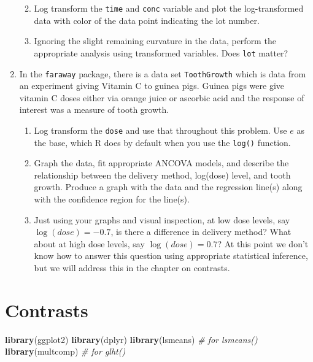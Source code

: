 \documentclass[]{book}
\newenvironment{Shaded}{\begin{snugshade}}{\end{snugshade}}
\newcommand{\KeywordTok}[1]{\textcolor[rgb]{0.13,0.29,0.53}{\textbf{{#1}}}}
\newcommand{\CommentTok}[1]{\textcolor[rgb]{0.56,0.35,0.01}{\textit{{#1}}}}
\newcommand{\NormalTok}[1]{{#1}}
\providecommand{\tightlist}{%
  \setlength{\itemsep}{0pt}\setlength{\parskip}{0pt}}
\theoremstyle{definition}
\theoremstyle{definition}
\theoremstyle{remark}
\begin{document}
\begin{enumerate}
  \begin{enumerate}
  \def\labelenumii{\alph{enumii}.}
  \tightlist
  \item
    Log transform the \texttt{time} and \texttt{conc} variable and plot
    the log-transformed data with color of the data point indicating the
    lot number.
  \item
    Ignoring the slight remaining curvature in the data, perform the
    appropriate analysis using transformed variables. Does \texttt{lot}
    matter?
  \end{enumerate}
\item
  In the \texttt{faraway} package, there is a data set
  \texttt{ToothGrowth} which is data from an experiment giving Vitamin C
  to guinea pigs. Guinea pigs were give vitamin C doses either via
  orange juice or ascorbic acid and the response of interest was a
  measure of tooth growth.

  \begin{enumerate}
  \def\labelenumii{\alph{enumii}.}
  \tightlist
  \item
    Log transform the \texttt{dose} and use that throughout this
    problem. Use \(e\) as the base, which R does by default when you use
    the \texttt{log()} function.
  \item
    Graph the data, fit appropriate ANCOVA models, and describe the
    relationship between the delivery method, log(dose) level, and tooth
    growth. Produce a graph with the data and the regression line(s)
    along with the confidence region for the line(s).
  \item
    Just using your graphs and visual inspection, at low dose levels,
    say \(\log(dose)=-0.7\), is there a difference in delivery method?
    What about at high dose levels, say \(\log(dose)=0.7\)? At this
    point we don't know how to answer this question using appropriate
    statistical inference, but we will address this in the chapter on
    contrasts.
  \end{enumerate}
\end{enumerate}

\chapter{Contrasts}\label{contrasts}

\begin{Shaded}
\begin{Highlighting}[]
\KeywordTok{library}\NormalTok{(ggplot2)}
\KeywordTok{library}\NormalTok{(dplyr)}
\KeywordTok{library}\NormalTok{(lsmeans)    }\CommentTok{# for lsmeans()}
\KeywordTok{library}\NormalTok{(multcomp)   }\CommentTok{# for glht() }
\end{Highlighting}
\end{Shaded}
\end{document}

